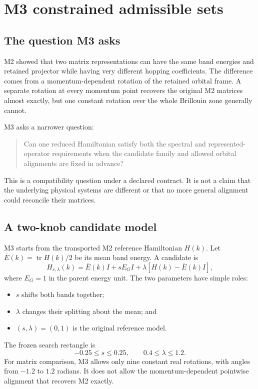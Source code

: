 \section{M3 constrained admissible sets}
\label{app:m3-constrained-admissible-sets}

\subsection{The question M3 asks}

M2 showed that two matrix representations can have the same band energies and
retained projector while having very different hopping coefficients. The
difference comes from a momentum-dependent rotation of the retained orbital
frame. A separate rotation at every momentum point recovers the original M2
matrices almost exactly, but one constant rotation over the whole Brillouin zone
generally cannot.

M3 asks a narrower question:
\begin{quote}
Can one reduced Hamiltonian satisfy both the spectral and
represented-operator requirements when the candidate family and allowed
orbital alignments are fixed in advance?
\end{quote}
This is a compatibility question under a declared contract. It is not a claim
that the underlying physical systems are different or that no more general
alignment could reconcile their matrices.

\subsection{A two-knob candidate model}

M3 starts from the transported M2 reference Hamiltonian $H(k)$. Let
$\overline E(k)=\operatorname{tr}H(k)/2$ be its mean band energy. A candidate is
\[
 H_{s,\lambda}(k)
 =\overline E(k)I+sE_GI
 +\lambda\left[H(k)-\overline E(k)I\right],
\]
where $E_G=1$ in the parent energy unit. The two parameters have simple roles:
\begin{itemize}
 \item $s$ shifts both bands together;
 \item $\lambda$ changes their splitting about the mean; and
 \item $(s,\lambda)=(0,1)$ is the original reference model.
\end{itemize}
The frozen search rectangle is
\[
 -0.25\leq s\leq0.25,
 \qquad
 0.4\leq\lambda\leq1.2.
\]
For matrix comparison, M3 allows only nine constant real rotations, with angles
from $-1.2$ to $1.2$ radians. It does not allow the momentum-dependent
pointwise alignment that recovers M2 exactly.

